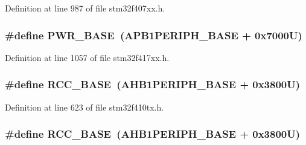 Definition at line 987 of file stm32f407xx.\+h.

\subsubsection[{\texorpdfstring{P\+W\+R\+\_\+\+B\+A\+SE}{PWR_BASE}}]{\setlength{\rightskip}{0pt plus 5cm}\#define P\+W\+R\+\_\+\+B\+A\+SE~({\bf A\+P\+B1\+P\+E\+R\+I\+P\+H\+\_\+\+B\+A\+SE} + 0x7000\+U)}\hypertarget{group___peripheral__registers__structures_gac691ec23dace8b7a649a25acb110217a}{}\label{group___peripheral__registers__structures_gac691ec23dace8b7a649a25acb110217a}


Definition at line 1057 of file stm32f417xx.\+h.

\subsubsection[{\texorpdfstring{R\+C\+C\+\_\+\+B\+A\+SE}{RCC_BASE}}]{\setlength{\rightskip}{0pt plus 5cm}\#define R\+C\+C\+\_\+\+B\+A\+SE~({\bf A\+H\+B1\+P\+E\+R\+I\+P\+H\+\_\+\+B\+A\+SE} + 0x3800\+U)}\hypertarget{group___peripheral__registers__structures_ga0e681b03f364532055d88f63fec0d99d}{}\label{group___peripheral__registers__structures_ga0e681b03f364532055d88f63fec0d99d}


Definition at line 623 of file stm32f410tx.\+h.

\subsubsection[{\texorpdfstring{R\+C\+C\+\_\+\+B\+A\+SE}{RCC_BASE}}]{\setlength{\rightskip}{0pt plus 5cm}\#define R\+C\+C\+\_\+\+B\+A\+SE~({\bf A\+H\+B1\+P\+E\+R\+I\+P\+H\+\_\+\+B\+A\+SE} + 0x3800\+U)}\hypertarget{group___peripheral__registers__structures_ga0e681b03f364532055d88f63fec0d99d}{}\label{group___peripheral__registers__structures_ga0e681b03f364532055d88f63fec0d99d}


